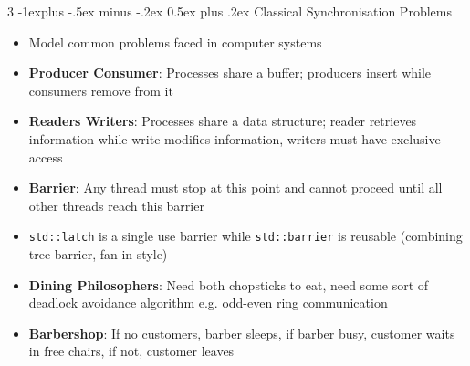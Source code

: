 \documentclass[10pt, landscape]{article}
\makeatletter
\renewcommand{\section}{\@startsection{section}{1}{0mm}%
                                {-1ex plus -.5ex minus -.2ex}%
                                {0.5ex plus .2ex}%
                                {\normalfont\large\bfseries}}
\renewcommand{\section}{\@startsection{section}{2}{0mm}%
                                {-1explus -.5ex minus -.2ex}%
                                {0.5ex plus .2ex}%
                                {\normalfont\normalsize\bfseries}}
\makeatother
\begin{document}
\begin{multicols*}{3}
\section{Classical Synchronisation Problems}
\begin{itemize}
    \item Model common problems faced in computer systems
    \item \textbf{Producer Consumer}: Processes share a buffer; producers insert while consumers remove from it
    \item \textbf{Readers Writers}: Processes share a data structure; reader retrieves information while write modifies information, writers must have exclusive access
    \item \textbf{Barrier}: Any thread must stop at this point and cannot proceed until all other threads reach this barrier
    \item \texttt{std::latch} is a single use barrier while \texttt{std::barrier} is reusable (combining tree barrier, fan-in style)
    \item \textbf{Dining Philosophers}: Need both chopsticks to eat, need some sort of deadlock avoidance algorithm e.g. odd-even ring communication
    \item \textbf{Barbershop}: If no customers, barber sleeps, if barber busy, customer waits in free chairs, if not, customer leaves
\end{itemize}


\end{multicols*}
\end{document}
